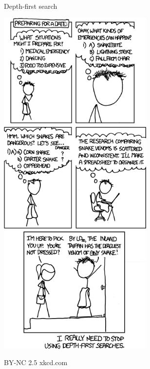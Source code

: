 \documentclass[a6paper,fontsize=10pt,twoside,open=right]{scrbook}
\begin{document}

\newpage

\vspace{15pt}

\vspace{15pt}

\newpage

\vspace{15pt}

\newpage

\vspace{15pt}

\newpage
\null
\vfill
\vspace*{-10pt}
\begin{center}
  \tiny{Depth-first search}\par
  \vspace{5pt}
  \includegraphics[keepaspectratio,width=0.58\textwidth]{elements/images/dfs_2.png}\par
  \vspace{5pt}
  \tiny{BY-NC 2.5 xkcd.com}
\end{center}
\end{document}
